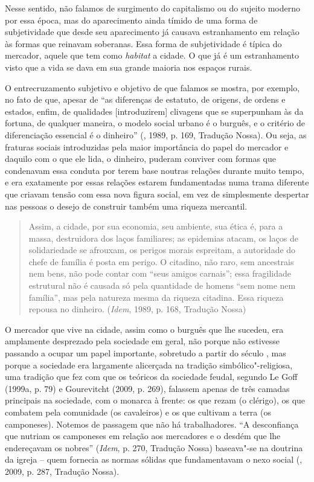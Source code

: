 Nesse sentido, não falamos de surgimento do capitalismo ou do sujeito
moderno por essa época, mas do aparecimento ainda tímido de uma forma de
subjetividade que desde seu aparecimento já causava estranhamento em
relação às formas que reinavam soberanas. Essa forma de subjetividade é
típica do mercador, aquele que tem como \emph{habitat} a cidade.
O que já é um estranhamento visto que a vida se dava em sua grande
maioria nos espaços rurais.

O entrecruzamento subjetivo e objetivo de que falamos se mostra, por
exemplo, no fato de que, apesar de ``as diferenças de estatuto, de
origens, de ordens e estados, enfim, de qualidades [introduzirem]
clivagens que se superpunham às da fortuna, de qualquer maneira, o
modelo social urbano é o burguês, e o critério de diferenciação
essencial é o dinheiro'' (, 1989, p. 169, Tradução Nossa). Ou
seja, as fraturas sociais introduzidas pela maior importância do papel
do mercador e daquilo com o que ele lida, o dinheiro, puderam conviver
com formas que condenavam essa conduta por terem base noutras relações
durante muito tempo, e era exatamente por essas relações estarem
fundamentadas numa trama diferente que criavam tensão com essa nova
figura social, em vez de simplesmente despertar nas pessoas o desejo de
construir também uma riqueza mercantil.

\begin{quote}
Assim, a cidade, por sua economia, seu ambiente, sua ética é, para a
massa, destruidora dos laços familiares; as epidemias atacam, os laços
de solidariedade se afrouxam, os perigos morais espreitam, a autoridade
do chefe de família é posta em perigo. O citadino, não raro, sem
ancestrais nem bens, não pode contar com ``seus amigos carnais''; essa
fragilidade estrutural não é causada só pela quantidade de homens ``sem
nome nem família'', mas pela natureza mesma da riqueza citadina. Essa
riqueza repousa no dinheiro. (\emph{Idem}, 1989, p. 168, Tradução Nossa)
\end{quote}

O mercador que vive na cidade, assim como o burguês que lhe sucedeu, era
amplamente desprezado pela sociedade em geral, não porque não estivesse
passando a ocupar um papel importante, sobretudo a partir do século
, mas porque a sociedade era largamente alicerçada na tradição
simbólico"-religiosa, uma tradição que fez com que os teóricos da
sociedade feudal, segundo Le Goff (1999a, p. 79) e Gourevitcht (2009, p.
269), falassem apenas de três camadas principais na sociedade, com o
monarca à frente: os que rezam (o clérigo), os que combatem pela
comunidade (os cavaleiros) e os que cultivam a terra (os camponeses).
Notemos de passagem que não há trabalhadores. ``A desconfiança que
nutriam os camponeses em relação aos mercadores e o desdém que lhe
endereçavam os nobres'' (\emph{Idem}, p. 270, Tradução Nossa) baseava"-se
na doutrina da igreja -- quem fornecia as normas sólidas que
fundamentavam o nexo social (, 2009, p. 287, Tradução Nossa).

